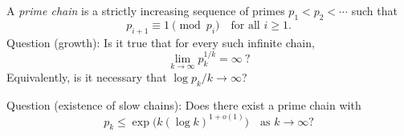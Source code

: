 A \emph{prime chain} is a strictly increasing sequence of primes $p_1<p_2<\cdots$ such that
\[
 p_{i+1}\equiv 1\pmod{p_i}\quad\text{for all }i\ge 1.
\]
Question (growth): Is it true that for every such infinite chain,
\[
\lim_{k\to\infty} p_k^{1/k}=\infty\ ?
\]
Equivalently, is it necessary that $\log p_k / k \to \infty$?

Question (existence of slow chains): Does there exist a prime chain with
\[
 p_k\le \exp\big(k(\log k)^{1+o(1)}\big)\quad\text{as }k\to\infty?
\]
